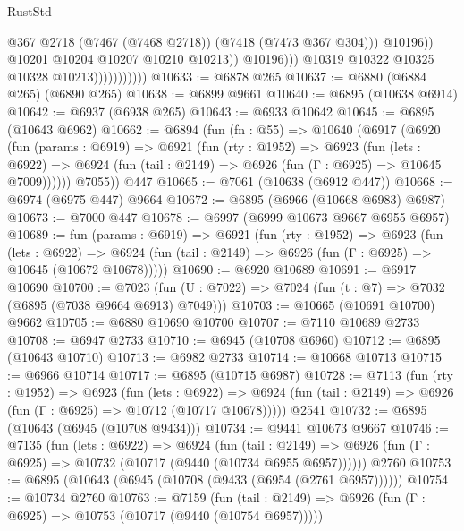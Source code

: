 \begin{lexlean}{RustStd}
\begin{coremodule}
                                          @367
                                          @2718
                                          (@7467 (@7468 @2718))
                                          (@7418 (@7473 @367 @304)))
                                        @10196))
                                    @10201
                                    @10204
                                    @10207
                                    @10210
                                    @10213))
                                @10196)))
                          @10319
                          @10322
                          @10325
                          @10328
                          @10213)))))))))))
@10633 := @6878 @265
@10637 := @6880 (@6884 @265) (@6890 @265)
@10638 := @6899 @9661
@10640 := @6895 (@10638 @6914)
@10642 := @6937 (@6938 @265)
@10643 := @6933 @10642
@10645 := @6895 (@10643 @6962)
@10662 := @6894
    (fun (fn : @55) =>
    @10640
      (@6917
        (@6920
          (fun (params : @6919) =>
          @6921
            (fun (rty : @1952) =>
            @6923
              (fun (lets : @6922) =>
              @6924 (fun (tail : @2149) => @6926 (fun (Γ : @6925) => @10645 @7009))))))
        @7055))
    @447
@10665 := @7061 (@10638 (@6912 @447))
@10668 := @6974 (@6975 @447) @9664
@10672 := @6895 (@6966 (@10668 @6983) @6987)
@10673 := @7000 @447
@10678 := @6997 (@6999 @10673 @9667 @6955 @6957)
@10689 := fun (params : @6919) =>
  @6921
    (fun (rty : @1952) =>
    @6923
      (fun (lets : @6922) =>
      @6924 (fun (tail : @2149) => @6926 (fun (Γ : @6925) => @10645 (@10672 @10678)))))
@10690 := @6920 @10689
@10691 := @6917 @10690
@10700 := @7023 (fun (U : @7022) => @7024 (fun (t : @7) => @7032 (@6895 (@7038 @9664 @6913) @7049)))
@10703 := @10665 (@10691 @10700) @9662
@10705 := @6880 @10690 @10700
@10707 := @7110 @10689 @2733
@10708 := @6947 @2733
@10710 := @6945 (@10708 @6960)
@10712 := @6895 (@10643 @10710)
@10713 := @6982 @2733
@10714 := @10668 @10713
@10715 := @6966 @10714
@10717 := @6895 (@10715 @6987)
@10728 := @7113
    (fun (rty : @1952) =>
    @6923
      (fun (lets : @6922) =>
      @6924 (fun (tail : @2149) => @6926 (fun (Γ : @6925) => @10712 (@10717 @10678)))))
    @2541
@10732 := @6895 (@10643 (@6945 (@10708 @9434)))
@10734 := @9441 @10673 @9667
@10746 := @7135
    (fun (lets : @6922) =>
    @6924
      (fun (tail : @2149) =>
      @6926 (fun (Γ : @6925) => @10732 (@10717 (@9440 (@10734 @6955 @6957))))))
    @2760
@10753 := @6895 (@10643 (@6945 (@10708 (@9433 (@6954 (@2761 @6957))))))
@10754 := @10734 @2760
@10763 := @7159
    (fun (tail : @2149) => @6926 (fun (Γ : @6925) => @10753 (@10717 (@9440 (@10754 @6957)))))

\end{coremodule}
\end{lexlean}
